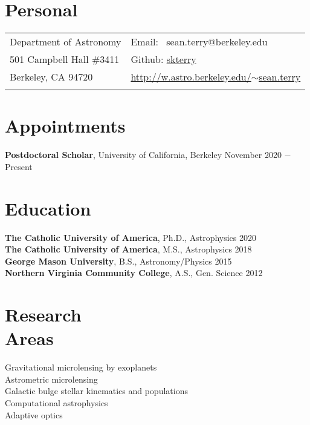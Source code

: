 \documentclass[margin,line]{res}
\begin{document}

\begin{resume}
\section{\sc Personal}

\vspace{.05in}
\begin{tabular}{@{}p{3.5in}p{3in}}
Department of Astronomy      & Email: \,\,\,sean.terry@berkeley.edu \\
501 Campbell Hall \#3411       &  Github: \hyperlink{https://github.com/skterry}{skterry} \\
Berkeley, CA 94720       & \hyperlink{http://w.astro.berkeley.edu/~sean.terry}{http://w.astro.berkeley.edu/$\sim$sean.terry}\\
 \\
\end{tabular}

\section{\sc Appointments}
{\bf Postdoctoral Scholar}, University of California, Berkeley  \hfill      {November 2020 $-$ Present}\\


\section{\sc Education}
{\bf The Catholic University of America}, Ph.D., Astrophysics  \hfill 2020\\
{\bf The Catholic University of America}, M.S., Astrophysics  \hfill 2018\\
{\bf George Mason University}, B.S., Astronomy/Physics \hfill 2015\\
{\bf Northern Virginia Community College}, A.S., Gen. Science \hfill 2012\\

\section{\sc Research\\ Areas}
Gravitational microlensing by exoplanets  \\
Astrometric microlensing \\
Galactic bulge stellar kinematics and populations  \\
Computational astrophysics \\
Adaptive optics \\



\end{resume}
\end{document}
